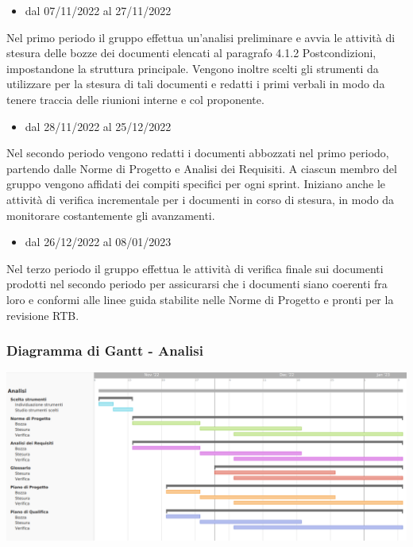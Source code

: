 \begin{itemize}
    \item dal 07/11/2022 al 27/11/2022
\end{itemize}
Nel primo periodo il gruppo effettua un’analisi preliminare e avvia le attività di stesura delle bozze dei documenti elencati al paragrafo 4.1.2 Postcondizioni, impostandone la struttura principale. Vengono inoltre scelti gli strumenti da utilizzare per la stesura di tali documenti e redatti i primi verbali in modo da tenere traccia delle riunioni interne e col proponente.

\begin{itemize}
    \item dal 28/11/2022 al 25/12/2022
\end{itemize}
Nel secondo periodo vengono redatti i documenti abbozzati nel primo periodo, partendo dalle Norme di Progetto e Analisi dei Requisiti. A ciascun membro del gruppo vengono affidati dei compiti specifici per ogni sprint. Iniziano anche le attività di verifica incrementale per i documenti in corso di stesura, in modo da monitorare costantemente gli avanzamenti.

\begin{itemize}
    \item dal 26/12/2022 al 08/01/2023
\end{itemize}
Nel terzo periodo il gruppo effettua le attività di verifica finale sui documenti prodotti nel secondo periodo per assicurarsi che i documenti siano coerenti fra loro e conformi alle linee guida stabilite nelle Norme di Progetto e pronti per la revisione RTB.

\subsubsection{Diagramma di Gantt - Analisi}
\includegraphics[width=\textwidth]{src/img/4_analisi.png}\\

